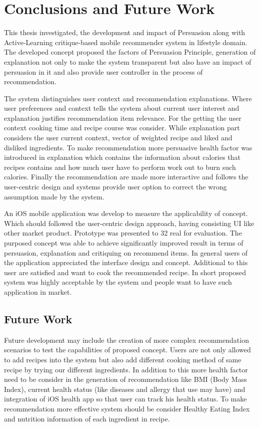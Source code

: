 \chapter{Conclusions and Future Work}


This thesis investigated, the development and impact of Persuasion along with Active-Learning critique-based mobile recommender system in lifestyle domain. The developed concept proposed the factors of Persuasion Principle, generation of explanation not only to make the system transparent but also have an impact of persuasion in it and also provide user controller in the process of recommendation.\newline

The system distinguishes user context and recommendation explanations. Where user preferences and context tells the system about current user interest and explanation justifies recommendation item relevance. For the getting the user context cooking time and recipe course was consider. While explanation part considers the user current context, vector of weighted recipe and liked and disliked ingredients. To make recommendation more persuasive health factor was introduced in explanation which contains the information about calories that recipes contains and how much user have to perform work out to burn such calories.  Finally the recommendation are made more interactive and follows the user-centric design and systems provide user option to correct the wrong assumption made by the system.\newline

An iOS mobile application was develop to measure the applicability of concept. Which should followed the user-centric design approach, having consisting UI like other market product. Prototype was presented to 32 real for evaluation. The purposed concept was able to achieve significantly improved result in terms of persuasion, explanation and critiquing on recommend items. In general users of the application appreciated the interface design and concept. Additional to this user are satisfied and want to cook the recommended recipe. In short proposed system was highly acceptable by the system and people want to have such application in market.\newline

\section{Future Work}
Future development may include the creation of more complex recommendation scenarios to test the capabilities of proposed concept. Users are not only allowed to add recipes into the system but also add different cooking method of same recipe by trying our different ingredients. In addition to this more health factor need to be consider in the generation of recommendation like BMI (Body Mass Index), current health status (like diseases and allergy that use may have) and integration of iOS health app so that user can track his health status. To make recommendation more effective system should be consider Healthy Eating Index and nutrition information of each ingredient in recipe.

